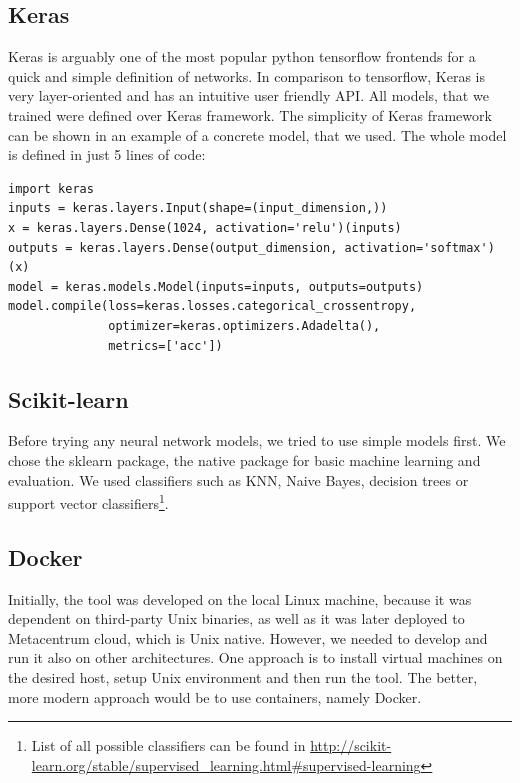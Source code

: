 \subsection{Keras}

Keras\cite{keras} is arguably one of the most popular python tensorflow frontends for a quick and simple definition of networks. In comparison to tensorflow, Keras is very layer-oriented and has an intuitive user friendly API. All models, that we trained were defined over Keras framework. The simplicity of Keras framework can be shown in an example of a concrete model, that we used. The whole model is defined in just 5 lines of code:

\begin{verbatim}
import keras
inputs = keras.layers.Input(shape=(input_dimension,))
x = keras.layers.Dense(1024, activation='relu')(inputs)
outputs = keras.layers.Dense(output_dimension, activation='softmax')(x)
model = keras.models.Model(inputs=inputs, outputs=outputs)
model.compile(loss=keras.losses.categorical_crossentropy,
              optimizer=keras.optimizers.Adadelta(),
              metrics=['acc'])

\end{verbatim}

\subsection{Scikit-learn}
 
Before trying any neural network models, we tried to use simple models first. We chose the sklearn\cite{scikit} package, the native package for basic machine learning and evaluation. We used classifiers such as KNN, Naive Bayes, decision trees or support vector classifiers\footnote{List of all possible classifiers can be found in \url{http://scikit-learn.org/stable/supervised\_learning.html\#supervised-learning}}. 

\subsection{Docker}

\label{docker}

Initially, the tool was developed on the local Linux machine, because it was dependent on third-party Unix binaries, as well as it was later deployed to Metacentrum cloud, which is Unix native. However, we needed to develop and run it also on other architectures. One approach is to install virtual machines on the desired host, setup Unix environment and then run the tool. The better, more modern approach would be to use containers, namely Docker\cite{docker}.

